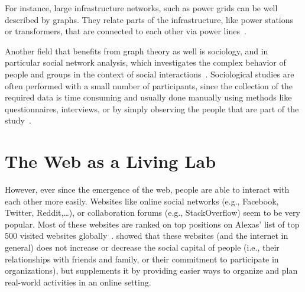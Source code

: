 For instance, large infrastructure networks, such as power grids can be well described by graphs.
They relate parts of the infrastructure, like power stations or transformers, that are connected to each other via power lines~\cite{Watts1998}.

Another field that benefits from graph theory as well is sociology, and in particular social network analysis, which investigates the complex behavior of people and groups in the context of social interactions~\cite{Newman2010}.
Sociological studies are often performed with a small number of participants, since the collection of the required data is time consuming and usually done manually using methods like questionnaires, interviews, or by simply observing the people that are part of the study~\cite{Wasserman1994}.




\section{The Web as a Living Lab}
\label{sec:the-web-as-lab}

However, ever since the emergence of the web, people are able to interact with each other more easily.
Websites like online social networks (e.g., Facebook, Twitter, Reddit,\ldots), or collaboration forums (e.g., StackOverflow) seem to be very popular.
Most of these websites are ranked on top positions on Alexas' list of top 500 visited websites globally~\cite{Alexa2017}.
\citet{Wellman2001} showed that these websites (and the internet in general) does not increase or decrease the social capital of people (i.e., their relationships with friends and family, or their commitment to participate in organizations), but supplements it by providing easier ways to organize and plan real-world activities in an online setting.

